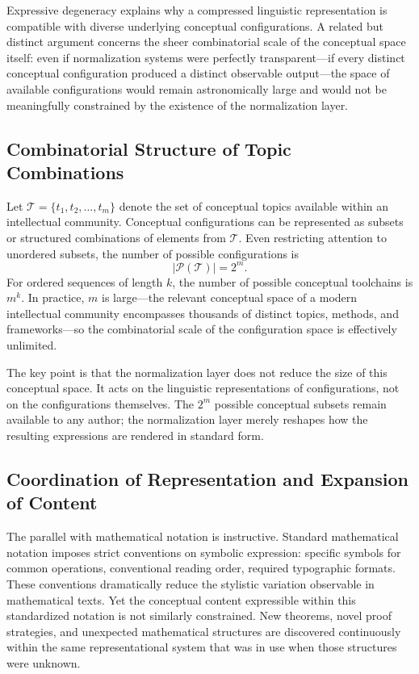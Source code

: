 \documentclass[12pt,a4paper]{article}
\theoremstyle{definition}
\theoremstyle{plain}
\theoremstyle{remark}
\newcommand{\calT}{\mathcal{T}}
\begin{document}
Expressive degeneracy explains why a compressed linguistic representation is compatible with
diverse underlying conceptual configurations. A related but distinct argument concerns the
sheer combinatorial scale of the conceptual space itself: even if normalization systems were
perfectly transparent---if every distinct conceptual configuration produced a distinct
observable output---the space of available configurations would remain astronomically large
and would not be meaningfully constrained by the existence of the normalization layer.

\subsection{Combinatorial Structure of Topic Combinations}

Let $\calT = \{t_1, t_2, \ldots, t_m\}$ denote the set of conceptual topics available within
an intellectual community. Conceptual configurations can be represented as subsets or
structured combinations of elements from $\calT$. Even restricting attention to unordered
subsets, the number of possible configurations is
\[
|\mathcal{P}(\calT)| = 2^m.
\]
For ordered sequences of length $k$, the number of possible conceptual toolchains is $m^k$.
In practice, $m$ is large---the relevant conceptual space of a modern intellectual community
encompasses thousands of distinct topics, methods, and frameworks---so the combinatorial
scale of the configuration space is effectively unlimited.

The key point is that the normalization layer does not reduce the size of this conceptual
space. It acts on the linguistic representations of configurations, not on the configurations
themselves. The $2^m$ possible conceptual subsets remain available to any author; the
normalization layer merely reshapes how the resulting expressions are rendered in standard
form.

\subsection{Coordination of Representation and Expansion of Content}

The parallel with mathematical notation is instructive. Standard mathematical notation imposes
strict conventions on symbolic expression: specific symbols for common operations,
conventional reading order, required typographic formats. These conventions dramatically
reduce the stylistic variation observable in mathematical texts. Yet the conceptual content
expressible within this standardized notation is not similarly constrained. New theorems,
novel proof strategies, and unexpected mathematical structures are discovered continuously
within the same representational system that was in use when those structures were unknown.
\end{document}
